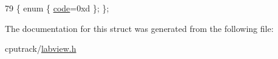 \begin{DoxyCode}
79 \{ \textcolor{keyword}{enum} \{ \hyperlink{struct_l_v_1_1_l_v_data_type_3_01std_1_1complex_3_01double_01_4_01_4_a5d1e77d83362a491e20731b4ad47c2f6a443567c038be617a340a2ebf5baa864d}{code}=0xd \}; \};
\end{DoxyCode}


The documentation for this struct was generated from the following file\+:\begin{DoxyCompactItemize}
\item 
cputrack/\hyperlink{labview_8h}{labview.\+h}\end{DoxyCompactItemize}
